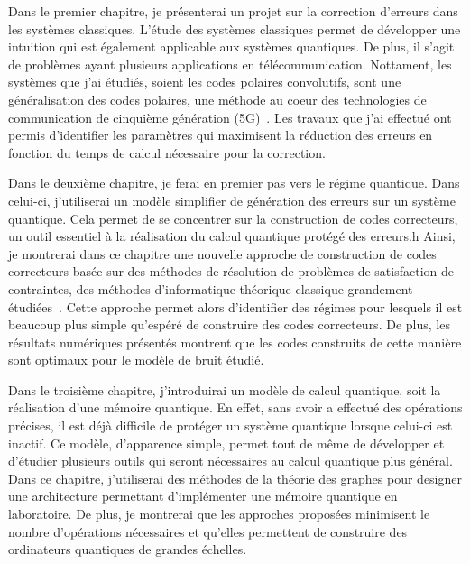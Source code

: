 Dans le premier chapitre,
je présenterai un projet sur la correction d'erreurs dans les systèmes classiques.
L'étude des systèmes classiques permet de développer une intuition qui est également
applicable aux systèmes quantiques.
De plus, il s'agit de problèmes ayant plusieurs applications en télécommunication.
Nottament,
les systèmes que j'ai étudiés,
soient les codes polaires convolutifs,
sont une généralisation des codes polaires,
une méthode au coeur des technologies de communication de cinquième génération (5G)~\cite{arikan_rate_2009, bioglio_design_2021}.
Les travaux que j'ai effectué ont permis d'identifier les paramètres qui maximisent la réduction des erreurs
en fonction du temps de calcul nécessaire pour la correction.

Dans le deuxième chapitre,
je ferai en premier pas vers le régime quantique.
Dans celui-ci,
j'utiliserai un modèle simplifier de génération des erreurs sur un système quantique.
Cela permet de se concentrer sur la construction de codes correcteurs,
un outil essentiel à la réalisation du calcul quantique protégé des erreurs.h
Ainsi,
je montrerai dans ce chapitre une nouvelle approche de construction de codes correcteurs
basée sur des méthodes de résolution de problèmes de satisfaction de contraintes,
des méthodes d'informatique théorique classique grandement étudiées~\cite{arora_computational_2009, noauthor_minizinc_nodate, noauthor_sat_nodate, achlioptas_rigorous_2005}.
Cette approche permet alors d'identifier des régimes pour lesquels il est beaucoup plus simple qu'espéré
de construire des codes correcteurs.
De plus,
les résultats numériques présentés montrent que les codes construits de cette manière
sont optimaux pour le modèle de bruit étudié.

Dans le troisième chapitre,
j'introduirai un modèle de calcul quantique,
soit la réalisation d'une mémoire quantique.
En effet,
sans avoir a effectué des opérations précises,
il est déjà difficile de protéger un système quantique lorsque celui-ci est inactif.
Ce modèle,
d'apparence simple,
permet tout de même de développer et d'étudier plusieurs outils qui seront nécessaires
au calcul quantique plus général.
Dans ce chapitre,
j'utiliserai des méthodes de la théorie des graphes pour designer une architecture 
permettant d'implémenter une mémoire quantique en laboratoire.
De plus,
je montrerai que les approches proposées minimisent le nombre d'opérations nécessaires
et qu'elles permettent de construire des ordinateurs quantiques de grandes échelles.

